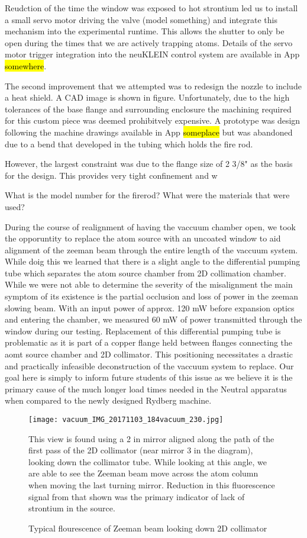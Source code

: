 Reudction of the time the window was exposed to hot strontium led us to install a small servo motor driving the valve (model something) and integrate this mechanism into the experimental runtime. 
This allows the shutter to only be open during the times that we are actively trapping atoms. 
Details of the servo motor trigger integration into the neuKLEIN control system are available in App \hl{somewhere}.

The second improvement that we attempted was to redesign the nozzle to include a heat shield. A CAD image is shown in figure. Unfortunately, due to the high tolerances of the base flange and surrounding enclosure the machining required for this custom piece was deemed prohibitvely expensive. A prototype was design following the machine drawings available in App \hl{someplace} but was abandoned due to a bend that developed in the tubing which holds the fire rod. 

However, the largest constraint was due to the flange size of 2 3/8" as the basis for the design. This provides very tight confinement and w

What is the model number for the firerod? What were the materials that were used? 

During the course of realignment of having the vaccuum chamber open, we took the opporuntity to replace the atom source with an uncoated window to aid alignment of the zeeman beam through the entire length of the vaccuum system. While doig this we learned that there is a slight angle to the differential pumping tube which separates the atom source chamber from 2D collimation chamber. While we were not able to determine the severity of the misalignment the main symptom of its existence is the partial occlusion and loss of power in the zeeman slowing beam. With an input power of approx. 120 mW before expansion optics and entering the chamber, we measured 60 mW of power transmitted through the window during our testing. Replacement of this differential pumping tube is problematic as it is part of a copper flange held between flanges connecting the aomt source chamber and 2D collimator. This positioning necessitates a drastic and practically infeasible deconstruction of the vaccuum system to replace. Our goal here is simply to inform future students of this issue as we believe it is the primary cause of the much longer load times needed in the Neutral apparatus when compared to the newly designed Rydberg machine.


	\begin{figure}
		\centerline{
		\texttt{[image: vacuum\_IMG\_20171103\_184vacuum\_230.jpg]}}
		\caption{Typical flourescence of Zeeman beam looking down 2D collimator}{This view is found using a 2 in mirror aligned along the path of the first pass of the 2D collimator (near mirror 3 in the diagram), looking down the collimator tube. While looking at this angle, we are able to see the Zeeman beam move across the atom column when moving the last turning mirror. Reduction in this fluorescence signal from that shown was the primary indicator of lack of strontium in the source.}
		\label{fig:2d_coll_flourescence}
	\end{figure} 
	
